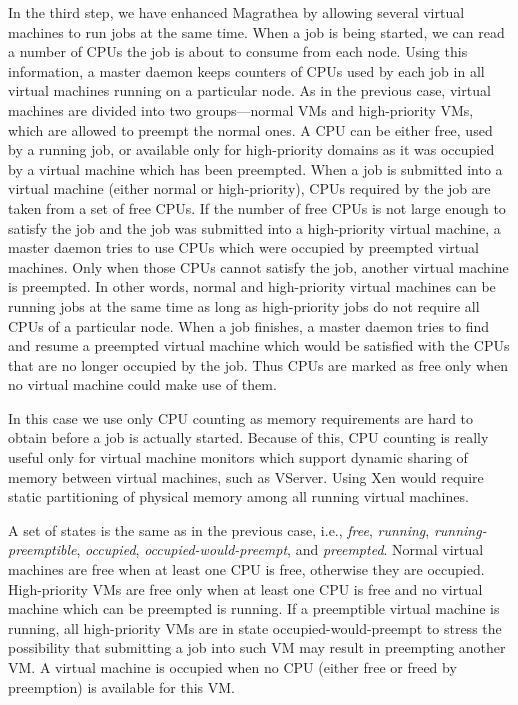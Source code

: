 \documentclass{sigplanconf}
\begin{document}
In the third step, we have enhanced Magrathea by allowing several virtual
machines to run jobs at the same time. When a job is being started, we can
read a number of CPUs the job is about to consume from each node. Using this
information, a master daemon keeps counters of CPUs used by each job in all
virtual machines running on a particular node. As in the previous case,
virtual machines are divided into two groups---normal VMs and high-priority
VMs, which are allowed to preempt the normal ones. A CPU can be either free,
used by a running job, or available only for high-priority domains as it was
occupied by a virtual machine which has been preempted. When a job is
submitted into a virtual machine (either normal or high-priority), CPUs
required by the job are taken from a set of free CPUs. If the number of free
CPUs is not large enough to satisfy the job and the job was submitted into a
high-priority virtual machine, a master daemon tries to use CPUs which were
occupied by preempted virtual machines. Only when those CPUs cannot satisfy
the job, another virtual machine is preempted. In other words, normal and
high-priority virtual machines can be running jobs at the same time as long as
high-priority jobs do not require all CPUs of a particular node. When a job
finishes, a master daemon tries to find and resume a preempted virtual machine
which would be satisfied with the CPUs that are no longer occupied by the job.
Thus CPUs are marked as free only when no virtual machine could make use of
them.

In this case we use only CPU counting as memory requirements are hard to
obtain before a job is actually started. Because of this, CPU counting is
really useful only for virtual machine monitors which support dynamic sharing
of memory between virtual machines, such as VServer. Using Xen would require
static partitioning of physical memory among all running virtual machines.

A set of states is the same as in the previous case, i.e., \textit{free},
\textit{running}, \textit{running-preemptible}, \textit{occupied},
\textit{occupied-would-preempt}, and \textit{preempted}. Normal virtual
machines are free when at least one CPU is free, otherwise they are occupied.
High-priority VMs are free only when at least one CPU is free and no virtual
machine which can be preempted is running. If a preemptible virtual machine is
running, all high-priority VMs are in state occupied-would-preempt to stress
the possibility that submitting a job into such VM may result in preempting
another VM. A virtual machine is occupied when no CPU (either free or freed by
preemption) is available for this VM.
\end{document}
